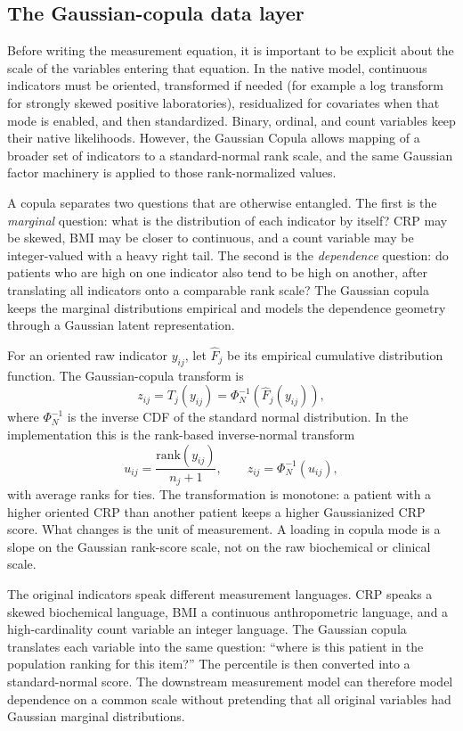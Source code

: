 \subsection{The Gaussian-copula data layer}
\label{sub:copula}
Before writing the measurement equation, it is important to be explicit about the scale of the variables entering
that equation. In the native model, continuous indicators must be oriented, transformed if needed (for example a log
transform for strongly skewed positive laboratories), residualized for covariates when that mode is enabled, and
then standardized. Binary, ordinal, and count variables keep their native likelihoods. However, the
Gaussian Copula allows mapping of a broader set of indicators to a standard-normal rank
scale, and the same Gaussian factor machinery is applied to those rank-normalized values.

A copula separates two questions that are otherwise entangled. The first is the \emph{marginal} question: what
is the distribution of each indicator by itself? CRP may be skewed, BMI may be closer to continuous, and a count
variable may be integer-valued with a heavy right tail. The second is the \emph{dependence} question: do patients
who are high on one indicator also tend to be high on another, after translating all indicators onto a comparable
rank scale? The Gaussian copula keeps the marginal distributions empirical and models the dependence geometry
through a Gaussian latent representation.

For an oriented raw indicator $y_{ij}$, let $\widehat F_j$ be its empirical cumulative distribution function.
The Gaussian-copula transform is
\begin{equation}
\label{eq:copula_transform}
z_{ij} = T_j(y_{ij}) = \Phi_N^{-1}\!\left(\widehat F_j(y_{ij})\right),
\end{equation}
where $\Phi_N^{-1}$ is the inverse CDF of the standard normal distribution. In the implementation this is the
rank-based inverse-normal transform
\begin{equation}
\label{eq:rank_int}
u_{ij}=\frac{\mathrm{rank}(y_{ij})}{n_j+1},\qquad z_{ij}=\Phi_N^{-1}(u_{ij}),
\end{equation}
with average ranks for ties. The transformation is monotone: a patient with a higher oriented CRP than another
patient keeps a higher Gaussianized CRP score. What changes is the unit of measurement. A loading in copula mode
is a slope on the Gaussian rank-score scale, not on the raw biochemical or clinical scale.

\begin{methodsbox}
The original indicators speak different measurement languages. CRP speaks a skewed biochemical language, BMI a
continuous anthropometric language, and a high-cardinality count variable an integer language. The Gaussian
copula translates each variable into the same question: ``where is this patient in the population ranking for
this item?'' The percentile is then converted into a standard-normal score. The downstream measurement model can
therefore model dependence on a common scale without pretending that all original variables had Gaussian
marginal distributions.
\end{methodsbox}

